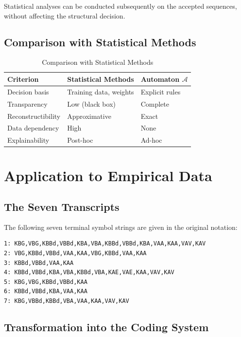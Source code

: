 \documentclass[
  12pt,
  a4paper,
  oneside,
  titlepage
]{article}
\begin{document}
Statistical analyses can be conducted subsequently on the accepted sequences, 
without affecting the structural decision.

\subsection{Comparison with Statistical Methods}

\begin{table}[h]
\centering
\caption{Comparison with Statistical Methods}
\label{tab:comparison}
\begin{tabular}{@{} p{3cm} p{4cm} p{4cm} @{}}
\toprule
\textbf{Criterion} & \textbf{Statistical Methods} & \textbf{Automaton \(\mathcal{A}\)} \\
\midrule
Decision basis & Training data, weights & Explicit rules \\
Transparency & Low (black box) & Complete \\
Reconstructibility & Approximative & Exact \\
Data dependency & High & None \\
Explainability & Post-hoc & Ad-hoc \\
\bottomrule
\end{tabular}
\end{table}

\section{Application to Empirical Data}

\subsection{The Seven Transcripts}

The following seven terminal symbol strings are given in the original notation:

\begin{verbatim}
1: KBG,VBG,KBBd,VBBd,KBA,VBA,KBBd,VBBd,KBA,VAA,KAA,VAV,KAV
2: VBG,KBBd,VBBd,VAA,KAA,VBG,KBBd,VAA,KAA
3: KBBd,VBBd,VAA,KAA
4: KBBd,VBBd,KBA,VBA,KBBd,VBA,KAE,VAE,KAA,VAV,KAV
5: KBG,VBG,KBBd,VBBd,KAA
6: KBBd,VBBd,KBA,VAA,KAA
7: KBG,VBBd,KBBd,VBA,VAA,KAA,VAV,KAV
\end{verbatim}

\subsection{Transformation into the Coding System}
\end{document}
